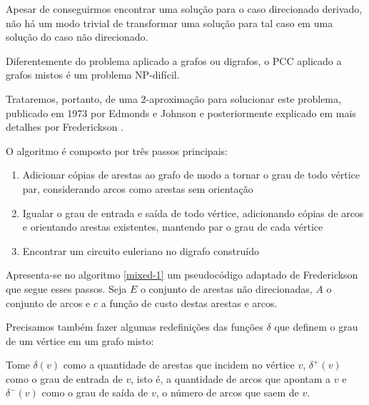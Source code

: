     Apesar de conseguirmos encontrar uma solução para o caso direcionado derivado, não há um modo trivial de transformar uma solução para tal caso em uma solução do caso não direcionado.

    Diferentemente do problema aplicado a grafos ou digrafos, o PCC aplicado a grafos mistos é um problema NP-difícil. 




    Trataremos, portanto, de uma  $2$-aproximação para solucionar este problema, publicado em 1973 por Edmonds e Johnson \cite{edmonds-johnson} e posteriormente explicado em mais detalhes por Frederickson \cite{frederickson}. 
    
    O algoritmo é composto por três passos principais:

    \begin{enumerate}
        \item Adicionar cópias de arestas ao grafo de modo a tornar o grau de todo vértice par, considerando arcos como arestas sem orientação
        \item Igualar o grau de entrada e saída de todo vértice, adicionando cópias de arcos e orientando arestas existentes, mantendo par o grau de cada vértice
        \item Encontrar um circuito euleriano no digrafo construído
    \end{enumerate}
    

    Apresenta-se no algoritmo \ref{mixed-1} um pseudocódigo adaptado de Frederickson \cite{frederickson} que segue esses passos.
    Seja $E$ o conjunto de arestas não direcionadas, $A$ o conjunto de arcos e $c$ a função de custo destas arestas e arcos.

    Precisamos também fazer algumas redefinições das funções $\delta$ que definem o grau de um vértice em um grafo misto:

    Tome $\delta(v)$ como a quantidade de arestas que incidem no vértice $v$, $\delta^+(v)$ como o grau de entrada de $v$, isto é, a quantidade de arcos que apontam a $v$ e $\delta^-(v)$ como o grau de saída de $v$, o número de arcos que saem de $v$.

